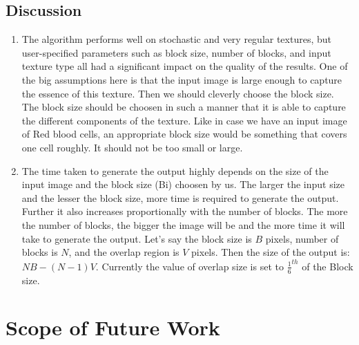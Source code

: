\documentclass[12pt,a4paper]{report}
\begin{document}
\section{Discussion}
\begin{enumerate}
  \item The algorithm performs well on stochastic and very regular textures, but user-specified parameters such as block size, number of blocks, and input texture type all had a significant impact on the quality of the results. One of the big assumptions here is that the input image is large enough to capture the essence of this texture. Then we should cleverly choose the block size. The block size should be choosen in such a manner that it is able to capture the different components of the texture. Like in case we have an input image of Red blood cells, an appropriate block size would be something that covers one cell roughly. It should not be too small or large.
  \item The time taken to generate the output highly depends on the size of the input image and the block size (Bi) choosen by us. The larger the input size and the lesser the block size, more time is required to generate the output. Further it also increases proportionally with the number of blocks. The more the number of blocks, the bigger the image will be and the more time it will take to generate the output. Let's say the block size is $B$ pixels, number of blocks is $N$, and the overlap region is $V$ pixels. Then the size of the output is: $NB - (N-1)V$. Currently the value of overlap size is set to $\frac{1}{6}^{th}$ of the Block size.
\end{enumerate}


\chapter{Scope of Future Work}



\newpage

\end{document}
